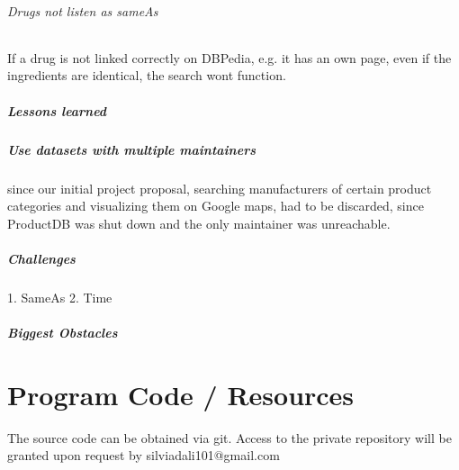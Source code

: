 \documentclass[11pt,titlepage,oneside,openany]{book}
\begin{document}
\subparagraph{Drugs not listen as sameAs}
If a drug is not linked correctly on DBPedia, e.g. it has an own page, even if the ingredients are identical, the search wont function.


\paragraph{Lessons learned}
\label{cha:lessons}


\paragraph{Use datasets with multiple maintainers} since our initial project proposal, searching manufacturers of certain product categories and visualizing them on Google maps, had to be discarded, since ProductDB was shut down and the only maintainer was unreachable.


\paragraph{Challenges}
\label{sec:challenges}

1. SameAs 
2. Time

\paragraph{Biggest Obstacles}
\label{sec:obstacle}

\label{sec:idea}



\appendix

\chapter{Program Code / Resources}
\label{cha:appendix-a}

The source code can be obtained via git. Access to the private repository will be granted upon request by silviadali101@gmail.com



\newpage
\end{document}
